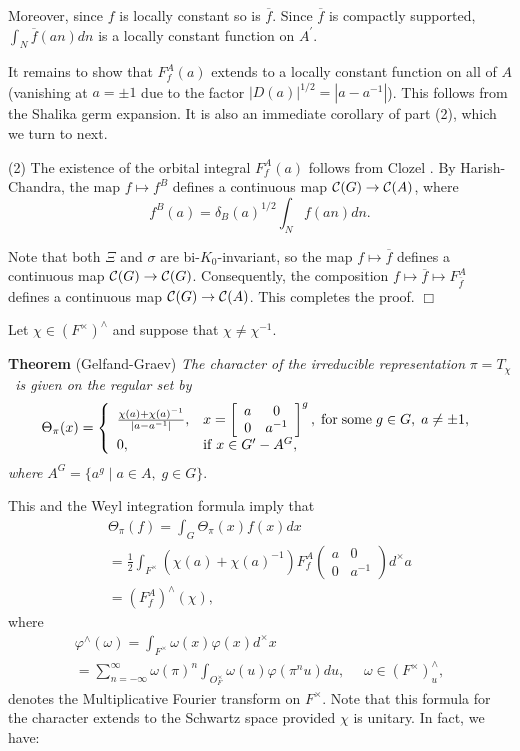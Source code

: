 \documentclass[11pt, a4paper]{article}
\begin{document}
Moreover, since $f$ is locally constant so is $\overline{f}$. Since $%
\overline{f}$ is compactly supported, $\int_N\overline{f}(an)dn$ is a
locally constant function on $A^{\prime }$.

It remains to show that $F_f^A(a)$ extends to a locally constant function on
all of $A$ (vanishing at $a=\pm 1$ due to the factor $|D(a)|^{1/2}=|a-a^{-1}|$). This follows from the Shalika germ expansion. It is also
an immediate corollary of part (2), which we turn to next.

(2) The existence of the orbital integral $F_f^A(a)$ follows from Clozel \cite{C}. By
Harish-Chandra, the map $f\longmapsto f^B$ defines a continuous map ${\cal C}%
(G)\rightarrow {\cal C}(A)$, where
\[
f^B(a)=\delta _B(a)^{1/2}\int_Nf(an)dn.
\]

Note that both $\Xi $ and $\sigma $ are bi-$K_0$-invariant, so the map $%
f\longmapsto \overline{f}$ defines a continuous map ${\cal C}(G)\rightarrow 
{\cal C}(G)$. Consequently, the composition $f\longmapsto \overline{f}%
\longmapsto F_{\overline{f}}^A$ defines a continuous map ${\cal C}%
(G)\rightarrow {\cal C}(A)$. This completes the proof. $\Box $

Let $\chi \in (F^{\times })^{\wedge }$ and suppose that $\chi \neq \chi
^{-1}$.

{\bf Theorem} (Gelfand-Graev) {\em The character of the irreducible
representation }$\pi =T_\chi ${\em \ is given on the regular set by}
\[
\Theta _\pi (x)=\left\{ 
\begin{array}{ll}
\frac{\chi (a)+\chi (a)^{-1}}{|a-a^{-1}|}, & x=\left[ 
\begin{array}{cc}
a & 0 \\ 
0 & a^{-1}
\end{array}
\right] ^g,\; {\rm for\;some}\;g\in G,\;a\neq \pm 1, \\ 
0, & {\rm if}\;x\in G^{\prime }-A^G,
\end{array}
\right.
\]
{\em where }$A^G=\{a^g\;|\;a\in A,\;g\in G\}$.

This and the Weyl integration formula imply that
\[
\begin{array}{c}
\Theta _\pi (f)=\int_G\Theta _\pi (x)f(x)dx \\ 
=\frac 12\int_{F^{\times }}(\chi (a)+\chi (a)^{-1})F_f^A\left( 
\begin{array}{cc}
a & 0 \\ 
0 & a^{-1}
\end{array}
\right)d^{\times }a \\ 
=(F_f^A)^{\wedge }(\chi ),
\end{array}
\]
where
\[
\begin{array}{c}
\varphi ^{\wedge }(\omega )=\int_{F^{\times }}\omega (x)\varphi (x)d^{\times
}x \\ 
=\sum_{n=-\infty }^\infty \omega (\pi )^n\int_{O_F^{\times }}\omega
(u)\varphi (\pi ^nu)du,\ \ \ \ \ \ \omega \in (F^{\times })_u^{\wedge },
\end{array}
\]
denotes the Multiplicative Fourier transform on $F^{\times }$. Note that this formula for
the character extends to the Schwartz space provided $\chi $ is unitary. In
fact, we have:
\end{document}
